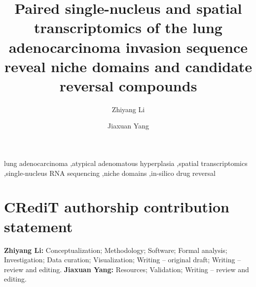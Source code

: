 \documentclass[review,12pt,authoryear]{elsarticle}
\begin{document}
\begin{frontmatter}

\title{Paired single-nucleus and spatial transcriptomics of the lung adenocarcinoma
invasion sequence reveal niche domains and candidate reversal compounds}

\author[gdmu]{Zhiyang Li}

\author[monash]{Jiaxuan Yang}



\begin{abstract}

\end{abstract}

\begin{keyword}
lung adenocarcinoma \sep atypical adenomatous hyperplasia \sep spatial transcriptomics
\sep single-nucleus RNA sequencing \sep niche domains \sep in-silico drug reversal
\end{keyword}

\end{frontmatter}








\FloatBarrier

\section*{CRediT authorship contribution statement}

\textbf{Zhiyang Li:} Conceptualization; Methodology; Software; Formal analysis;
Investigation; Data curation; Visualization; Writing -- original draft; Writing -- review
and editing. \textbf{Jiaxuan Yang:} Resources; Validation; Writing -- review and editing.
\end{document}
